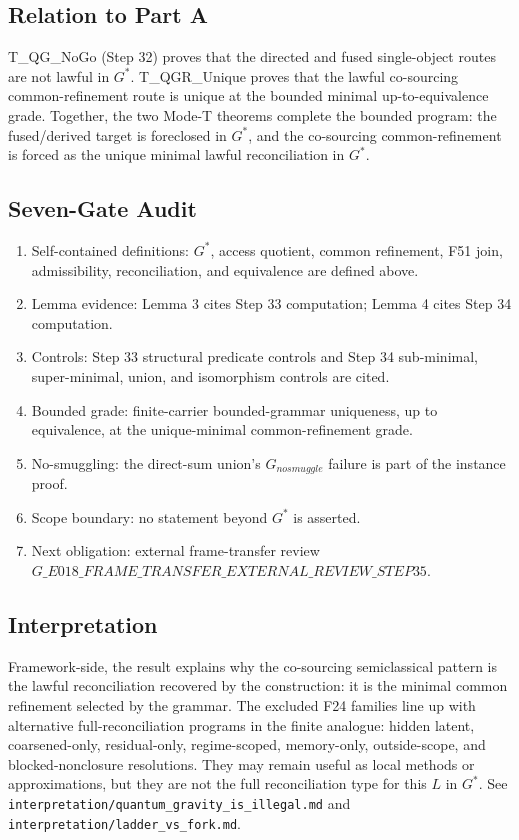 \subsection*{Relation to Part A}

T\_QG\_NoGo (Step 32) proves that the directed and fused single-object routes
are not lawful in \(G^\ast\).  T\_QGR\_Unique proves that the lawful
co-sourcing common-refinement route is unique at the bounded minimal
up-to-equivalence grade.  Together, the two Mode-T theorems complete the
bounded program: the fused/derived target is foreclosed in \(G^\ast\), and the
co-sourcing common-refinement is forced as the unique minimal lawful
reconciliation in \(G^\ast\).

\subsection*{Seven-Gate Audit}

\begin{enumerate}
\item Self-contained definitions: \(G^\ast\), access quotient, common
  refinement, F51 join, admissibility, reconciliation, and equivalence are
  defined above.
\item Lemma evidence: Lemma 3 cites Step 33 computation; Lemma 4 cites Step 34
  computation.
\item Controls: Step 33 structural predicate controls and Step 34
  sub-minimal, super-minimal, union, and isomorphism controls are cited.
\item Bounded grade: finite-carrier bounded-grammar uniqueness, up to
  equivalence, at the unique-minimal common-refinement grade.
\item No-smuggling: the direct-sum union's \(G_{nosmuggle}\) failure is part of
  the instance proof.
\item Scope boundary: no statement beyond \(G^\ast\) is asserted.
\item Next obligation: external frame-transfer review
  \(G\_E018\_FRAME\_TRANSFER\_EXTERNAL\_REVIEW\_STEP35\).
\end{enumerate}

\subsection*{Interpretation}

Framework-side, the result explains why the co-sourcing semiclassical pattern
is the lawful reconciliation recovered by the construction: it is the minimal
common refinement selected by the grammar.  The excluded F24 families line up
with alternative full-reconciliation programs in the finite analogue: hidden
latent, coarsened-only, residual-only, regime-scoped, memory-only,
outside-scope, and blocked-nonclosure resolutions.  They may remain useful as
local methods or approximations, but they are not the full reconciliation type
for this \(L\) in \(G^\ast\).  See
\texttt{interpretation/quantum\_gravity\_is\_illegal.md}
and
\texttt{interpretation/ladder\_vs\_fork.md}.

